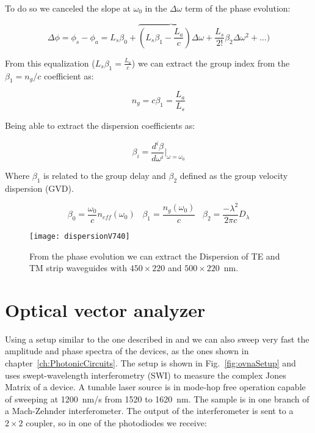 To do so we canceled the slope at $\omega_0$ in the $\Delta \omega$ term of the phase evolution:

\begin{equation}
	\Delta \phi = \phi_{s}-\phi_{a}= L_s \beta_0 + \overbrace{ (L_s\beta_1-\frac{L_a}{c})\Delta \omega }+\frac{L_s}{2!}\beta_2\Delta \omega^2 + \ldots)
\end{equation}

From this equalization ($ L_s\beta_1=\frac{L_{a}}{c}$) we can extract the group index from the $\beta_1=n_g/c$ coefficient as:

\begin{equation}
	 n_g=c \beta_1=\frac{L_a}{L_s}
\end{equation}


Being able to extract the dispersion coefficients as:

\begin{equation}
  \beta_i=\frac{d^i\beta}{d\omega^i}\bigg|_{\omega=\omega_0}
\end{equation}


Where $\beta_1$ is related to the group delay and $\beta_2$ defined as the group velocity dispersion (GVD).

\begin{equation}
  \beta_0=\frac{\omega_0}{c} n_{eff}(\omega_0) \,\,\,\,\,  \beta_1=\frac{n_g(\omega_0)}{c} \,\,\,\,\, \beta_2=\frac{-\lambda^2}{2\pi c}D_\lambda
\end{equation}



\begin{figure}[htb]
	\centering
	\texttt{[image: dispersionV740]}
	\caption{From the phase evolution we can extract the Dispersion of TE and TM strip waveguides with $450 \times 220$ and $500 \times 220$~nm.}
	\label{fig:dispersionMeasurements}
\end{figure}


\section{Optical vector analyzer}
\label{ch:method}
Using a setup similar to the one described in \cite{Vanwiggeren2003} and \cite{Gifford2005} we can also sweep very fast the amplitude and phase spectra of the devices, as the ones shown in chapter~\ref{ch:PhotonicCircuits}. The setup is shown in Fig.~\ref{fig:ovnaSetup} and uses swept-wavelength interferometry (SWI) to measure the complex Jones Matrix of a device. A tunable laser source is in mode-hop free operation capable of sweeping at 1200~nm/s from 1520 to 1620~nm. The sample is in one branch of a Mach-Zehnder interferometer. The output of the interferometer is sent to a $2 \times 2$ coupler, so in one of the photodiodes we receive:


